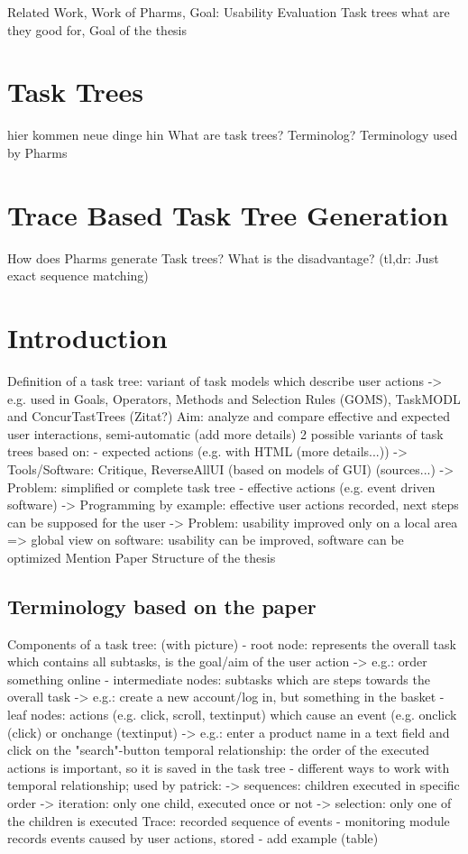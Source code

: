 Related Work, Work of Pharms, Goal: Usability Evaluation \citep{harms2013}
Task trees what are they good for, Goal of the thesis
\section{Task Trees}
hier kommen neue dinge hin
What are task trees? Terminolog? Terminology used by Pharms
\section{Trace Based Task Tree Generation}
How does Pharms generate Task trees? What is the disadvantage? (tl,dr: Just exact sequence matching)
\section{Introduction}
Definition of a task tree: variant of task models which describe user actions
-> e.g. used in Goals, Operators, Methods and Selection Rules (GOMS), TaskMODL and ConcurTastTrees (Zitat?)
Aim: analyze and compare effective and expected user interactions, semi-automatic (add more details)
2 possible variants of task trees based on:
- expected actions (e.g. with HTML (more details...))
-> Tools/Software: Critique, ReverseAllUI (based on models of GUI) (sources...)
-> Problem: simplified or complete task tree
- effective actions (e.g. event driven software)
-> Programming by example: effective user actions recorded, next steps can be supposed for the user
-> Problem: usability improved only on a local area
=> global view on software: usability can be improved, software can be optimized
Mention Paper
Structure of the thesis
\subsection{Terminology based on the paper}
Components of a task tree: (with picture)
- root node: represents the overall task which contains all subtasks, is the goal/aim of the user action
-> e.g.: order something online
- intermediate nodes: subtasks which are steps towards the overall task
-> e.g.: create a new account/log in, but something in the basket
- leaf nodes: actions (e.g. click, scroll, textinput) which cause an event (e.g. onclick (click) or onchange (textinput)
-> e.g.: enter a product name in a text field and click on the "search"-button
temporal relationship: the order of the executed actions is important, so it is saved in the task tree
- different ways to work with temporal relationship; used by patrick:
-> sequences: children executed in specific order
-> iteration: only one child, executed once or not
-> selection: only one of the children is executed
Trace: recorded sequence of events
- monitoring module records events caused by user actions, stored
- add example (table)
